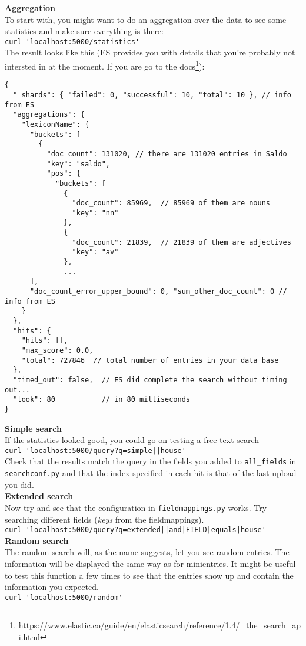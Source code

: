 \documentclass[
12pt, %
a4paper, %
oneside, %
headinclude,footinclude, %
BCOR0mm, %
]{scrartcl}
\begin{document}
\textbf{Aggregation}\\
To start with, you might want to do an aggregation over the data
to see some statistics and make sure everything is there:\\
\verb|curl 'localhost:5000/statistics'|\\
The result looks like this (ES provides you with details that you're probably not intersted in at the
moment. If you are go to the docs\footnote{%
\url{https://www.elastic.co/guide/en/elasticsearch/reference/1.4/_the_search_api.html}}):
\begin{verbatim}
{
  "_shards": { "failed": 0, "successful": 10, "total": 10 }, // info from ES
  "aggregations": {
    "lexiconName": {
      "buckets": [
        {
          "doc_count": 131020, // there are 131020 entries in Saldo
          "key": "saldo",
          "pos": {
            "buckets": [
              {
                "doc_count": 85969,  // 85969 of them are nouns
                "key": "nn"
              },
              {
                "doc_count": 21839,  // 21839 of them are adjectives
                "key": "av"
              },
              ...
      ],
      "doc_count_error_upper_bound": 0, "sum_other_doc_count": 0 // info from ES
    }
  },
  "hits": {
    "hits": [],
    "max_score": 0.0,
    "total": 727846  // total number of entries in your data base
  },
  "timed_out": false,  // ES did complete the search without timing out...
  "took": 80           // in 80 milliseconds
}
\end{verbatim}

\textbf{Simple search}\\
If the statistics looked good, you could go on testing a free text search\\
\verb_curl 'localhost:5000/query?q=simple||house'_\\
Check that the results match the query in the fields you added to
\verb|all_fields| in \\ \verb|searchconf.py|
and that the index specified in each hit is that of the
last upload you did.\\

\textbf{Extended search}\\
Now try and see that the configuration in \verb|fieldmappings.py| works.
Try searching different fields (\textit{keys} from the fieldmappings).\\
\verb_curl 'localhost:5000/query?q=extended||and|FIELD|equals|house'_\\


\textbf{Random search}\\
The random search will, as the name suggests, let you see
random entries. The information will be displayed the same
way as for minientries. It might be useful to test this function
a few times to see that the entries show up and contain the information
you expected.\\
\verb_curl 'localhost:5000/random'_\\
\end{document}
